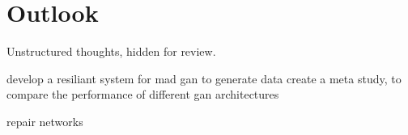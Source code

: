 \section{Outlook}\label{outlook}

Unstructured thoughts, hidden for review. 

develop a resiliant system for mad gan to generate data
create a meta study, to compare the performance of different gan architectures


repair networks
\cite{Tanno2022repairingneuralnetworkfromcorrupt}




% 


% 



% 


% 


% 


% 


% 


